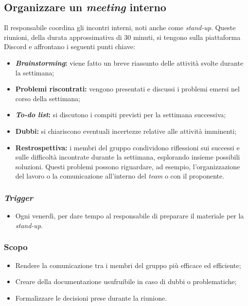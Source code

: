 \subsection{Organizzare un \textit{meeting} interno}
\label{organizzare-meeting-interno}

Il responsabile coordina gli incontri interni, noti anche come \textit{stand-up}. 
Queste riunioni, della durata approssimativa di 30 minuti, si tengono sulla piattaforma Discord e affrontano i seguenti punti chiave: 
\begin{itemize}
	\item \textbf{\textit{Brainstorming}:} viene fatto un breve riassunto delle attività svolte durante la settimana;
	\item \textbf{Problemi riscontrati:} vengono presentati e discussi i problemi emersi nel corso della settimana;
	\item \textbf{\textit{To-do list}:} si discutono i compiti previsti per la settimana successiva;
	\item \textbf{Dubbi:} si chiariscono eventuali incertezze relative alle attività imminenti;
	\item \textbf{Restrospettiva:} i membri del gruppo condividono riflessioni sui successi e sulle difficoltà incontrate durante la settimana, esplorando insieme possibili soluzioni.
		Questi problemi possono riguardare, ad esempio, l'organizzazione del lavoro o la comunicazione all'interno del \textit{team} o con il proponente.
\end{itemize}

\subsubsection{\textit{Trigger}}
\begin{itemize}
	\item Ogni venerdì, per dare tempo al responsabile di preparare il materiale
	      per la \textit{stand-up}.
\end{itemize}

\subsubsection{Scopo}
\begin{itemize}
	\item Rendere la comunicazione tra i membri del gruppo più efficace ed
	      efficiente;

	\item Creare della documentazione usufruibile in caso di dubbi o
	      problematiche;

	\item Formalizzare le decisioni prese durante la riunione.
\end{itemize}

